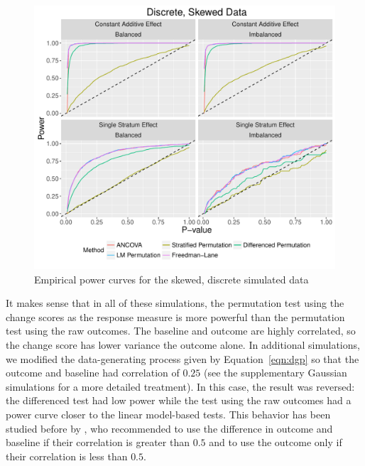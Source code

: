 \documentclass[12pt]{article}
\begin{document}
\begin{figure}
\centering
\includegraphics[width = \textwidth]{fig/skewed_simulation_power.pdf}
\caption{Empirical power curves for the skewed, discrete simulated data}
\label{fig:skewed_sim_power}
\end{figure}

\begin{center}

\end{center}

It makes sense that in all of these simulations, the permutation test using the change scores as the response measure is more powerful than the permutation test using the raw outcomes.
The baseline and outcome are highly correlated, so the change score has lower variance the outcome alone.
In additional simulations, 
we modified the data-generating process given by Equation~\ref{eqn:dgp} so that the outcome and baseline had correlation of $0.25$ (see the supplementary Gaussian simulations for a more detailed treatment).
In this case, the result was reversed: 
the differenced test had low power while the test using the raw outcomes had a power curve closer to the linear model-based tests.
This behavior has been studied before by \cite{frison_repeated_1992}, who recommended to use the difference in outcome and baseline if their correlation is greater than $0.5$ and to use the outcome only if their correlation is less than $0.5$.
\end{document}
